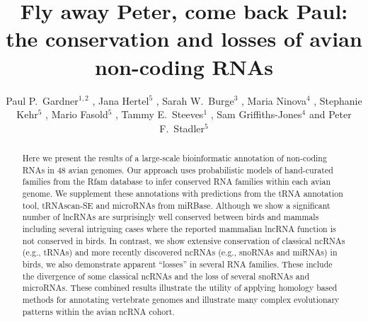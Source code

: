 \documentclass[10pt]{bmc_article}
\newenvironment{bmcformat}{\begin{raggedright}\baselineskip20pt\sloppy\setboolean{publ}{false}}{\end{raggedright}\baselineskip20pt\sloppy}
\begin{document}
\begin{bmcformat}

\title{Fly away Peter, come back Paul: the conservation and losses of avian non-coding RNAs}

\author{
Paul P.\ Gardner\correspondingauthor$^{1,2}$
,
Jana Hertel$^5$
,
Sarah W.\ Burge$^3$
,
Maria Ninova$^4$
,
Stephanie Kehr$^5$
,
Mario Fasold$^5$
,
Tammy E.\ Steeves$^1$
,
Sam Griffiths-Jones$^4$
and
Peter F.\ Stadler\correspondingauthor$^5$
}
\address{
\iid(1) School of Biological Sciences, University of Canterbury, Private Bag 4800, Christchurch, New Zealand.
\iid(2) Biomolecular Interaction Centre, University of Canterbury, Private Bag 4800, Christchurch, New Zealand.
\iid(3) European Molecular Biology Laboratory, European Bioinformatics Institute, Hinxton, Cambridge, CB10 1SD, UK.
\iid(4) Faculty of Life Sciences, University of Manchester, Manchester, United Kingdom.
\iid(5) Bioinformatics Group, Department of Computer Science; and Interdisciplinary Center for Bioinformatics, University of Leipzig, H{\"a}rtelstrasse 16-18, D-04107 Leipzig, Germany
}

\maketitle

\begin{abstract}
Here we present the results of a large-scale bioinformatic annotation
of non-coding RNAs in 48 avian genomes. Our approach uses
probabilistic models of hand-curated families from the Rfam database
to infer conserved RNA families within each avian genome. We
supplement these annotations with predictions from the tRNA annotation
tool, tRNAscan-SE and microRNAs from miRBase.  Although we show a
significant number of lncRNAs are surprisingly well conserved between
birds and mammals including several intriguing cases where the
reported mammalian lncRNA function is not conserved in birds.  In
contrast, we show extensive conservation of classical ncRNAs (e.g.,
tRNAs) and more recently discovered ncRNAs (e.g., snoRNAs
and miRNAs) in birds, we also demonstrate apparent ``losses'' in
several RNA families. These include the divergence of some classical
ncRNAs and the loss of several snoRNAs and microRNAs.  These combined
results illustrate the utility of applying homology based methods for
annotating vertebrate genomes and illustrate many complex evolutionary
patterns within the avian ncRNA cohort.
\end{abstract}


\end{bmcformat}
\end{document}
